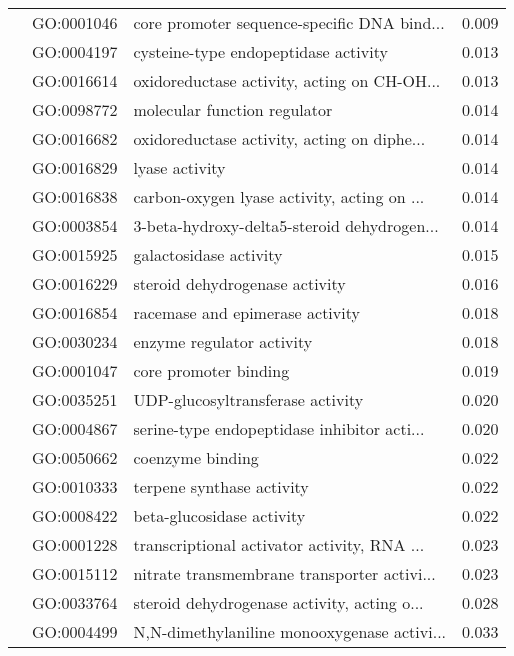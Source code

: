 \begin{longtable}{lllr}
   & GO:0001046 &  core promoter sequence-specific DNA bind... &         0.009 \\
   & GO:0004197 &         cysteine-type endopeptidase activity &         0.013 \\
   & GO:0016614 &  oxidoreductase activity, acting on CH-OH... &         0.013 \\
   & GO:0098772 &                 molecular function regulator &         0.014 \\
   & GO:0016682 &  oxidoreductase activity, acting on diphe... &         0.014 \\
   & GO:0016829 &                               lyase activity &         0.014 \\
   & GO:0016838 &  carbon-oxygen lyase activity, acting on ... &         0.014 \\
   & GO:0003854 &  3-beta-hydroxy-delta5-steroid dehydrogen... &         0.014 \\
   & GO:0015925 &                       galactosidase activity &         0.015 \\
   & GO:0016229 &               steroid dehydrogenase activity &         0.016 \\
   & GO:0016854 &              racemase and epimerase activity &         0.018 \\
   & GO:0030234 &                    enzyme regulator activity &         0.018 \\
   & GO:0001047 &                        core promoter binding &         0.019 \\
   & GO:0035251 &             UDP-glucosyltransferase activity &         0.020 \\
   & GO:0004867 &  serine-type endopeptidase inhibitor acti... &         0.020 \\
   & GO:0050662 &                             coenzyme binding &         0.022 \\
   & GO:0010333 &                    terpene synthase activity &         0.022 \\
   & GO:0008422 &                    beta-glucosidase activity &         0.022 \\
   & GO:0001228 &  transcriptional activator activity, RNA ... &         0.023 \\
   & GO:0015112 &  nitrate transmembrane transporter activi... &         0.023 \\
   & GO:0033764 &  steroid dehydrogenase activity, acting o... &         0.028 \\
   & GO:0004499 &  N,N-dimethylaniline monooxygenase activi... &         0.033 \\

\end{longtable}

